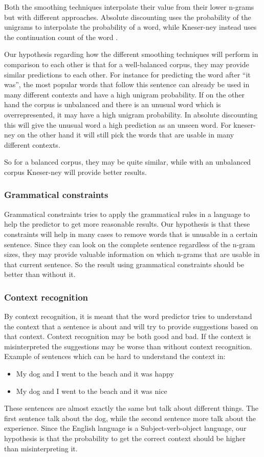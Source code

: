 Both the smoothing techniques interpolate their value from their lower n-grams but with different approaches. Absolute discounting uses the probability of the unigrams to interpolate the probability of a word, while Kneser-ney instead uses the continuation count of the word \cite{coursera}.

Our hypothesis regarding how the different smoothing techniques will perform in comparison to each other is that for a well-balanced corpus, they may provide similar predictions to each other. For instance for predicting the word after “it was”, the most popular words that follow this sentence can already be used in many different contexts and have a high unigram probability. If on the other hand the corpus is unbalanced and there is an unusual word which is overrepresented, it may have a high unigram probability. In absolute discounting this will give the unusual word a high prediction as an unseen word. For kneser-ney on the other hand it will still pick the words that are usable in many different contexts.

So for a balanced corpus, they may be quite similar, while with an unbalanced corpus Kneser-ney will provide better results.
\subsubsection{Grammatical constraints}
Grammatical constraints tries to apply the grammatical rules in a language to help the predictor to get more reasonable results. Our hypothesis is that these constraints will help in many cases to remove words that is unusable in a certain sentence. Since they can look on the complete sentence regardless of the n-gram sizes, they may provide valuable information on which n-grams that are usable in that current sentence. So the result using grammatical constraints should be better than without it.
\subsubsection{Context recognition}
By context recognition, it is meant that the word predictor tries to understand the context that a sentence is about and will try to provide suggestions based on that context. Context recognition may be both good and bad. If the context is misinterpreted the suggestions may be worse than without context recognition. Example of sentences which can be hard to understand the context in:

\begin{itemize}
\item My dog and I went to the beach and it was happy
\item My dog and I went to the beach and it was nice
\end{itemize}
These sentences are almost exactly the same but talk about different things. The first sentence talk about the dog, while the second sentence more talk about the experience.
Since the English language is a Subject-verb-object language, our hypothesis is that the probability to get the correct context should be higher than misinterpreting it.

